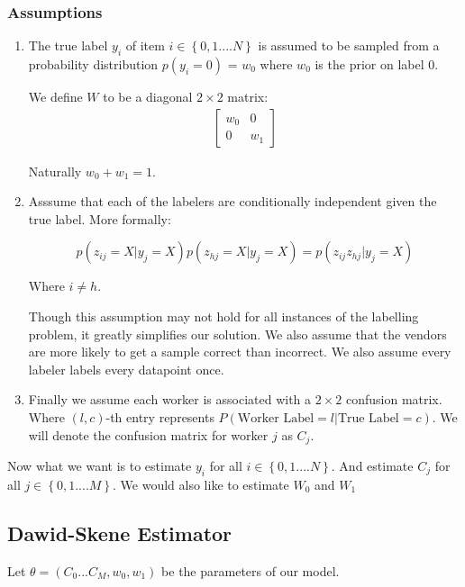 \subsubsection{Assumptions}
\begin{enumerate}
\item
The true label $y_{i}$ of item
$i \in \left\{0,1....N\right\} $ is assumed to be sampled from a probability
distribution $p(y_{i} = 0)$ = $w_{0}$ where $w_{0}$ is the prior on label 0.

We define $W$ to be a diagonal $2 \times 2$ matrix:
\begin{align}
\begin{bmatrix}
w_{0} & 0 \\
0     & w_{1}
\end{bmatrix}
\end{align}

Naturally $w_{0} + w_{1} = 1$. \\

\item
Asssume that each of the labelers are conditionally independent given the true label. More formally:

$$p(z_{ij} = X | y_{j} = X)p(z_{hj} = X | y_{j} = X) = p(z_{ij}z_{hj} | y_{j} = X)$$

Where $i \neq h$.

Though this assumption may not hold for all instances of the labelling problem, it greatly simplifies our solution. We also assume that the vendors are more likely to get a sample correct than incorrect. We also assume every labeler labels every datapoint once.

\item
Finally we assume each worker is associated with a $2 \times 2$ confusion matrix. Where $(l,c)$-th entry represents $P(\text{Worker Label} = l| \text{True Label} = c)$. We will denote the confusion matrix for worker $j$ as  $C_{j}$.

\end{enumerate}

Now what we want is to estimate $y_{i}$ for all $i \in \left\{0,1....N\right\}$. And estimate $C_{j}$ for all $j \in \left\{0,1....M\right\}$. 
We would also like to estimate $W_{0}$ and $W_{1}$

\subsection{Dawid-Skene Estimator}
Let $\theta = (C_{0}...C_{M},w_{0},w_{1})$ be the parameters of our model.

